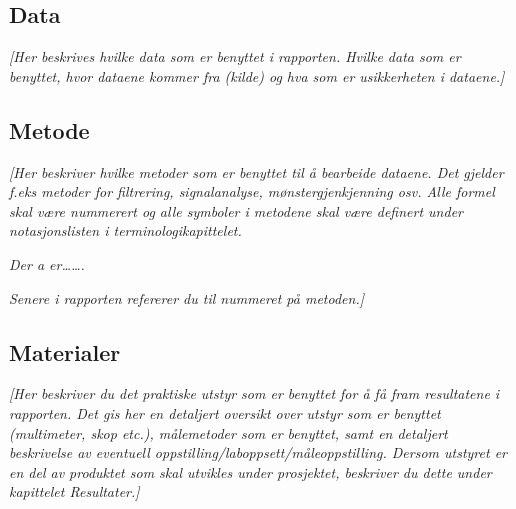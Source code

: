 \documentclass[../main.tex]{subfiles}
\begin{document}
\bigskip

\subsection{Data}

\bigskip

{\itshape\color{blue}
[Her beskrives hvilke data som er benyttet i rapporten. Hvilke data som er benyttet, hvor dataene kommer fra (kilde) og
hva som er usikkerheten i dataene.]}


\bigskip

\subsection[Metode]{Metode}

\bigskip

{\itshape\color{blue}
[Her beskriver hvilke metoder som er benyttet til {\aa} bearbeide dataene. Det gjelder f.eks metoder for filtrering,
signalanalyse, m{\o}nstergjenkjenning osv. Alle formel skal v{\ae}re nummerert og alle symboler i metodene skal
v{\ae}re definert under notasjonslisten i terminologikapittelet. }

{\itshape\color{blue}
Der a er{\dots}{\dots}.}

{\itshape\color{blue}
Senere i rapporten refererer du til nummeret p{\aa} metoden.]}


\bigskip

\subsection{Materialer}

\bigskip

{\itshape\color{blue}
[Her beskriver du det praktiske utstyr som er benyttet for {\aa} f{\aa} fram resultatene i rapporten. Det gis her en
detaljert oversikt over utstyr som er benyttet (multimeter, skop etc.), m{\aa}lemetoder som er benyttet, samt en
detaljert beskrivelse av eventuell oppstilling/laboppsett/m{\aa}leoppstilling. Dersom utstyret er en del av produktet
som skal utvikles under prosjektet, beskriver du dette under kapittelet Resultater.]}


\bigskip
\end{document}
